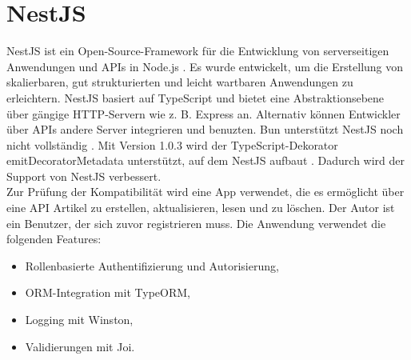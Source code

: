 \section{NestJS} \label{sec:compabitility-nestjs}
NestJS ist ein Open-Source-Framework für die Entwicklung von serverseitigen Anwendungen und APIs in Node.js \cite{Mysliwiec.2023}. Es wurde entwickelt, um die Erstellung von skalierbaren, gut strukturierten und leicht wartbaren Anwendungen zu erleichtern. NestJS basiert auf TypeScript und bietet eine Abstraktionsebene über gängige HTTP-Servern wie z. B. Express an. Alternativ können Entwickler über APIs andere Server integrieren und benuzten. Bun unterstützt NestJS noch nicht vollständig \cite{Sumner.2022}. Mit Version 1.0.3 wird der TypeScript-Dekorator \glqq emitDecoratorMetadata\grqq{} unterstützt, auf dem NestJS aufbaut \cite{McDonnel.2023}. Dadurch wird der Support von NestJS verbessert.\\

\noindent
Zur Prüfung der Kompatibilität wird eine App verwendet, die es ermöglicht über eine API Artikel zu erstellen, aktualisieren, lesen und zu löschen. Der Autor ist ein Benutzer, der sich zuvor registrieren muss. Die Anwendung verwendet die folgenden Features:

\begin{itemize}
	\item Rollenbasierte Authentifizierung und Autorisierung,
	\item ORM-Integration mit TypeORM,
	\item Logging mit Winston,
	\item Validierungen mit Joi.
\end{itemize}

